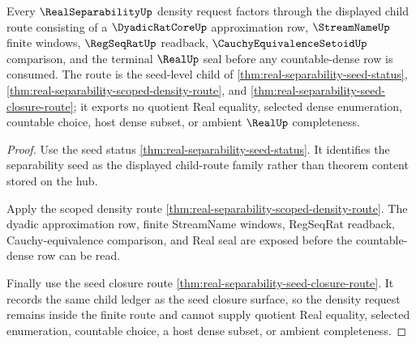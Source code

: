 \begin{theorem}
\label{thm:real-separability-seed-child-route}
Every $\RealSeparabilityUp$ density request factors through the displayed child route consisting of a $\DyadicRatCoreUp$ approximation row, $\StreamNameUp$ finite windows, $\RegSeqRatUp$ readback, $\CauchyEquivalenceSetoidUp$ comparison, and the terminal $\RealUp$ seal before any countable-dense row is consumed. The route is the seed-level child of \autoref{thm:real-separability-seed-status}, \autoref{thm:real-separability-scoped-density-route}, and \autoref{thm:real-separability-seed-closure-route}; it exports no quotient Real equality, selected dense enumeration, countable choice, host dense subset, or ambient $\RealUp$ completeness.
\end{theorem}
\begin{proof}
Use the seed status \autoref{thm:real-separability-seed-status}. It identifies the separability seed as the displayed child-route family rather than theorem content stored on the hub.

Apply the scoped density route \autoref{thm:real-separability-scoped-density-route}. The dyadic approximation row, finite StreamName windows, RegSeqRat readback, Cauchy-equivalence comparison, and Real seal are exposed before the countable-dense row can be read.

Finally use the seed closure route \autoref{thm:real-separability-seed-closure-route}. It records the same child ledger as the seed closure surface, so the density request remains inside the finite route and cannot supply quotient Real equality, selected enumeration, countable choice, a host dense subset, or ambient completeness.
\end{proof}
